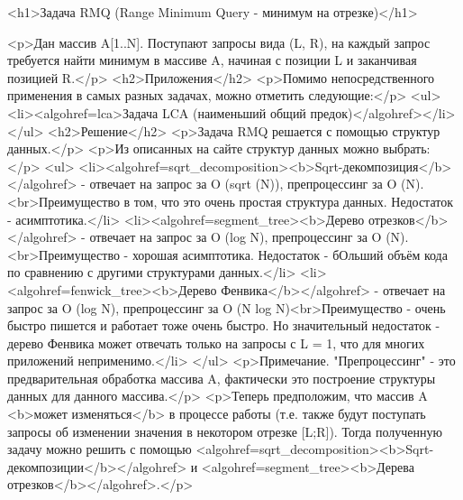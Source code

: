 <h1>Задача RMQ (Range Minimum Query - минимум на отрезке)</h1>

<p>Дан массив A[1..N]. Поступают запросы вида (L, R), на каждый запрос требуется найти минимум в массиве A, начиная с позиции L и заканчивая позицией R.</p>
<h2>Приложения</h2>
<p>Помимо непосредственного применения в самых разных задачах, можно отметить следующие:</p>
<ul>
<li><algohref=lca>Задача LCA (наименьший общий предок)</algohref></li>
</ul>
<h2>Решение</h2>
<p>Задача RMQ решается с помощью структур данных.</p>
<p>Из описанных на сайте структур данных можно выбрать:</p>
<ul>
<li><algohref=sqrt_decomposition><b>Sqrt-декомпозиция</b></algohref> - отвечает на запрос за O (sqrt (N)), препроцессинг за O (N).<br>Преимущество в том, что это очень простая структура данных. Недостаток - асимптотика.</li>
<li><algohref=segment_tree><b>Дерево отрезков</b></algohref> - отвечает на запрос за O (log N), препроцессинг за O (N).<br>Преимущество - хорошая асимптотика. Недостаток - бОльший объём кода по сравнению с другими структурами данных.</li>
<li><algohref=fenwick_tree><b>Дерево Фенвика</b></algohref> - отвечает на запрос за O (log N), препроцессинг за O (N log N)<br>Преимущество - очень быстро пишется и работает тоже очень быстро. Но значительный недостаток - дерево Фенвика может отвечать только на запросы с L = 1, что для многих приложений неприменимо.</li>
</ul>
<p>Примечание. "Препроцессинг" - это предварительная обработка массива A, фактически это построение структуры данных для данного массива.</p>
<p>Теперь предположим, что массив A <b>может изменяться</b> в процессе работы (т.е. также будут поступать запросы об изменении значения в некотором отрезке [L;R]). Тогда полученную задачу можно решить с помощью <algohref=sqrt_decomposition><b>Sqrt-декомпозиции</b></algohref> и <algohref=segment_tree><b>Дерева отрезков</b></algohref>.</p>